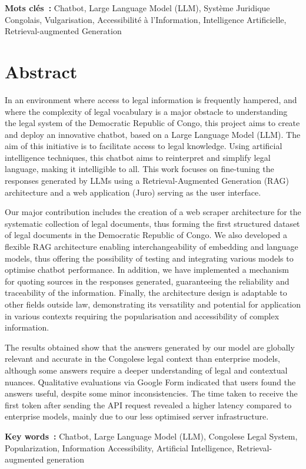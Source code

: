 \vspace{1cm}
\textbf{Mots clés~:} Chatbot, Large Language Model (LLM), Système Juridique Congolais, Vulgarisation, Accessibilité à l'Information, Intelligence Artificielle, Retrieval-augmented Generation
\endgroup			

\vfill
\pagebreak

\begingroup
\let\clearpage\relax
\let\cleardoublepage\relax
\let\cleardoublepage\relax

\chapter*{Abstract}
In an environment where access to legal information is frequently hampered, and where the complexity of legal vocabulary is a major obstacle to understanding the legal system of the Democratic Republic of Congo, this project aims to create and deploy an innovative chatbot, based on a Large Language Model (LLM). The aim of this initiative is to facilitate access to legal knowledge. Using artificial intelligence techniques, this chatbot aims to reinterpret and simplify legal language, making it intelligible to all. This work focuses on fine-tuning the responses generated by LLMs using a Retrieval-Augmented Generation (RAG) architecture and a web application (Juro) serving as the user interface.

Our major contribution includes the creation of a web scraper architecture for the systematic collection of legal documents, thus forming the first structured dataset of legal documents in the Democratic Republic of Congo. We also developed a flexible RAG architecture enabling interchangeability of embedding and language models, thus offering the possibility of testing and integrating various models to optimise chatbot performance. In addition, we have implemented a mechanism for quoting sources in the responses generated, guaranteeing the reliability and traceability of the information. Finally, the architecture design is adaptable to other fields outside law, demonstrating its versatility and potential for application in various contexts requiring the popularisation and accessibility of complex information.

The results obtained show that the answers generated by our model are globally relevant and accurate in the Congolese legal context than enterprise models, although some answers require a deeper understanding of legal and contextual nuances. Qualitative evaluations via Google Form indicated that users found the answers useful, despite some minor inconsistencies. The time taken to receive the first token after sending the API request revealed a higher latency compared to enterprise models, mainly due to our less optimised server infrastructure.

\vspace{1cm}
\textbf{Key words~:} Chatbot, Large Language Model (LLM), Congolese Legal System, Popularization, Information Accessibility, Artificial Intelligence, Retrieval-augmented generation
\endgroup			

\vfill
